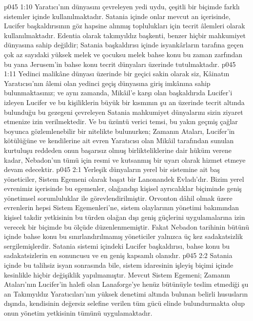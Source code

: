 \vs p045 1:10 Yaratıcı’nın dünyasını çevreleyen yedi uydu, çeşitli bir biçimde farklı sistemler içinde kullanılmaktadır. Satania içinde onlar mevcut an içerisinde, Lucifer başkaldırısının göz hapsine alınmış toplulukları için tecrit âlemleri olarak kullanılmaktadır. Edentia olarak takımyıldız başkenti, benzer hiçbir mahkumiyet dünyasına sahip değildir; Satania başkaldırısı içinde isyankârların tarafına geçen çok az sayıdaki yüksek melek ve çocuksu melek bahse konu bu zaman zarfından bu yana Jerusem’in bahse konu tecrit dünyaları üzerinde tutulmaktadır.
\vs p045 1:11 Yedinci malikâne dünyası üzerinde bir geçici sakin olarak siz, Kâinatın Yaratıcısı’nın âlemi olan yedinci geçiş dünyasına giriş imkânına sahip bulunmaktasınız; ve aynı zamanda, Mikâil’e karşı olan başkaldırıda Lucifer’i izleyen Lucifer ve bu kişiliklerin büyük bir kısmının şu an üzerinde tecrit altında bulunduğu bu gezegeni çevreleyen Satania mahkumiyet dünyalarını sizin ziyaret etmenize izin verilmektedir. Ve bu üzüntü verici temsi, bu yakın geçmiş çağlar boyunca gözlemlenebilir bir nitelikte bulunurken; Zamanın Ataları, Lucifer’in kötülüğüne ve kendilerine ait evren Yaratıcısı olan Mikâil tarafından sunulan kurtuluşu reddeden onun başarısız olmuş birlikteliklerine dair hüküm verene kadar, Nebadon’un tümü için resmi ve kutsanmış bir uyarı olarak hizmet etmeye devam edecektir.
\vs p045 2:1 Yerleşik dünyaların yerel bir sistemine ait baş yöneticiler, Sistem Egemeni olarak başat bir Lanonandek Evladı’dır. Bizim yerel evrenimiz içerisinde bu egemenler, olağandışı kişisel ayrıcalıklar biçiminde geniş yönetimsel sorumluluklar ile görevlendirilmiştir. Orvonton dâhil olmak üzere evrenlerin hepsi Sistem Egemenleri’ne, sistem olaylarının yönetimi bakımından kişisel takdir yetkisinin bu türden olağan dışı geniş güçlerini uygulamalarına izin verecek bir biçimde bu ölçüde düzenlenmemiştir. Fakat Nebadon tarihinin bütünü içinde bahse konu bu sınırlandırılmamış yöneticiler yalnızca üç kez sadakatsizlik sergilemişlerdir. Satania sistemi içindeki Lucifer başkaldırısı, bahse konu bu sadakatsizlerin en sonuncusu ve en geniş kapsamlı olanıdır.
\vs p045 2:2 Satania içinde bu talihsiz isyan sonrasında bile, sistem idaresinin işleyiş biçimi içinde kesinlikle hiçbir değişiklik yapılmamıştır. Mevcut Sistem Egemeni; Zamanın Ataları’nın Lucifer’in halefi olan Lanaforge’ye henüz bütünüyle teslim etmediği şu an Takımyıldız Yaratıcıları’nın yüksek denetimi altında bulunan belirli hususların dışında, kendisinin değersiz selefine verilen tüm gücü elinde bulundurmakta olup onun yönetim yetkisinin tümünü uygulamaktadır.
